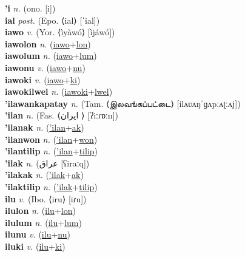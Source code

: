 \textbf{'i} \textit{n.} (ono. [i])
 \label{'i} \\
\textbf{ial} \textit{post.} (Epo. ⟨ial⟩ [ˈial])
 \label{ial} \\
\textbf{iawo} \textit{v.} (Yor. ⟨ìyàwó⟩ [ìjáwó])
 \label{iawo} \\
\textbf{iawolon} \textit{n.} (\hyperref[iawo]{iawo}+\hyperref[lon]{lon})
 \label{iawolon} \\
\textbf{iawolum} \textit{n.} (\hyperref[iawo]{iawo}+\hyperref[lum]{lum})
 \label{iawolum} \\
\textbf{iawonu} \textit{v.} (\hyperref[iawo]{iawo}+\hyperref[nu]{nu})
 \label{iawonu} \\
\textbf{iawoki} \textit{v.} (\hyperref[iawo]{iawo}+\hyperref[ki]{ki})
 \label{iawoki} \\
\textbf{iawokilwel} \textit{n.} (\hyperref[iawoki]{iawoki}+\hyperref[lwel]{lwel})
 \label{iawokilwel} \\
\textbf{'ilawankapatay} \textit{n.} (Tam. ⟨இலவங்கப்பட்டை⟩ [ilʌʋʌŋˈɡʌpːʌʈːʌj])
 \label{'ilawankapatay} \\
\textbf{'ilan} \textit{n.} (Fas. ⟨ایران‎ ⟩ [ʔiːɾɒːn])
 \label{'ilan} \\
\textbf{'ilanak} \textit{n.} (\hyperref['ilan]{'ilan}+\hyperref[ak]{ak})
 \label{'ilanak} \\
\textbf{'ilanwon} \textit{n.} (\hyperref['ilan]{'ilan}+\hyperref[won]{won})
 \label{'ilanwon} \\
\textbf{'ilantilip} \textit{n.} (\hyperref['ilan]{'ilan}+\hyperref[tilip]{tilip})
 \label{'ilantilip} \\
\textbf{'ilak} \textit{n.} ({\arabics{}عراق} [ʕiraːq])
 \label{'ilak} \\
\textbf{'ilakak} \textit{n.} (\hyperref['ilak]{'ilak}+\hyperref[ak]{ak})
 \label{'ilakak} \\
\textbf{'ilaktilip} \textit{n.} (\hyperref['ilak]{'ilak}+\hyperref[tilip]{tilip})
 \label{'ilaktilip} \\
\textbf{ilu} \textit{v.} (Ibo. ⟨iru⟩ [iɾu])
 \label{ilu} \\
\textbf{ilulon} \textit{n.} (\hyperref[ilu]{ilu}+\hyperref[lon]{lon})
 \label{ilulon} \\
\textbf{ilulum} \textit{n.} (\hyperref[ilu]{ilu}+\hyperref[lum]{lum})
 \label{ilulum} \\
\textbf{ilunu} \textit{v.} (\hyperref[ilu]{ilu}+\hyperref[nu]{nu})
 \label{ilunu} \\
\textbf{iluki} \textit{v.} (\hyperref[ilu]{ilu}+\hyperref[ki]{ki})
 \label{iluki} \\
